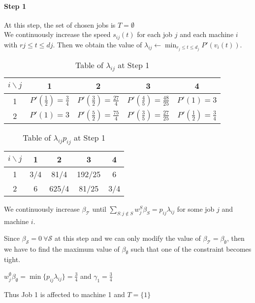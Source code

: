 \documentclass[11pt,a4paper]{article}
\begin{document}
\paragraph{Step 1}
At this step, the set of chosen jobs is $T=\emptyset$\\

We continuously increase the speed $s_{ij}(t)$ for each job $j$ and each machine $i$ with $r j \le t \le d j$.
Then we obtain the value of $\lambda_{ij} \gets \min_{r_{j} \leq t \leq d_{j}} P'(v_{i}(t))$.


\begin{table}[H]
\centering
\begin{tabular}{|c|c|c|c|c|}
\hline 
$i \backslash j$ & 1 & 2 & 3 & 4 \\ 
\hline 
1 & $P'(\frac{1}{2})=\frac{3}{4}$ & $P'(\frac{3}{2})=\frac{27}{4}$ & $P'(\frac{4}{5})=\frac{48}{25}$ & $P'(1)=3$ \\ 
\hline 
2 & $P'(1)=3$ & $P'(\frac{5}{2})=\frac{75}{4}$ & $P'(\frac{3}{5})=\frac{27}{25}$ & $P'(\frac{1}{2})=\frac{3}{4}$ \\ 
\hline 
\end{tabular} 
\caption{Table of $\lambda_{ij}$ at Step 1}
\end{table}


\begin{table}[H]
\centering
\begin{tabular}{|c|c|c|c|c|}
\hline 
$i \backslash j$ & 1 & 2 & 3 & 4 \\ 
\hline 
1 & 3/4 & 81/4 & 192/25 & 6 \\ 
\hline 
2 & 6 & 625/4 & 81/25 & 3/4 \\ 
\hline 
\end{tabular} 
\caption{Table of $\lambda_{ij}p_{ij}$ at Step 1}
\end{table}

We continuously increase $\beta_{\mathcal{T}}$ until
		$\sum_{S: j \notin S} w^{S}_{j}\beta_{S} = p_{ij}\lambda_{ij}$ for some job $j$ 
		and machine $i$.

Since $\beta_{\mathcal{S}}=0~\forall \mathcal{S}$ at this step and we can only modify 
the value of $\beta_{\mathcal{T}}=\beta_{\emptyset}$, then we have to find the maximum 
value of $\beta_{\emptyset}$ such that one of the constraint becomes tight.

$w^{\emptyset}_{j} \beta_{\emptyset}=\min \{ p_{ij}\lambda_{ij}   \} =  \frac{3}{4}$ and 
$\gamma_1=\frac{3}{4}$

Thus Job 1 is affected to machine 1 and $T=\{ 1 \}$
\end{document}
